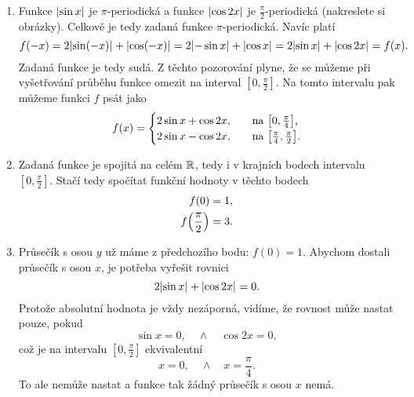 \documentclass[answers]{exam}
\begin{document}
\begin{questions}
\begin{solution}
\begin{enumerate}
    	\item Funkce $\abs{\sin x}$ je $\pi$-periodická a funkce $\abs{\cos 2x}$ je $\frac{\pi}{2}$-periodická (nakreslete si obrázky). Celkově je tedy zadaná funkce $\pi$-periodická. Navíc platí
    	\begin{equation*}
    		f(-x) = 2 \abs{\sin(-x)} + \abs{\cos(-x)} = 2 \abs{- \sin x} + \abs{\cos x} = 2 \abs{\sin x} + \abs{\cos 2x} = f(x).
    	\end{equation*}
    	Zadaná funkce je tedy sudá. Z těchto pozorování plyne, že se můžeme při vyšetřování průběhu funkce omezit na interval $[0, \frac{\pi}{2}]$. Na tomto intervalu pak můžeme funkci $f$ psát jako
    	\begin{equation}
    		\label{eq:1}
    		f(x)
    		=
    		\begin{cases}
    			2 \sin x + \cos 2x, &\quad \text{na $\brackets{0, \frac{\pi}{4}}$,}
    			\\
    			2 \sin x - \cos 2x, &\quad \text{na $\brackets{\frac{\pi}{4}, \frac{\pi}{2}}$.}
    		\end{cases}
    	\end{equation}
    	
    	\item \label{item:4b}
    		Zadaná funkce je spojitá na celém $\mathbb{R}$, tedy i v krajních bodech intervalu $[0, \frac{\pi}{2}]$. Stačí tedy spočítat funkční hodnoty v těchto bodech
    		\begin{align*}
    			f(0)
    			&=
    			1,
    			\\
    			f\parens{\frac{\pi}{2}}
    			&=
    			3.
    		\end{align*}
    	\item 
    		Průsečík s osou $y$ už máme z předchozího bodu: $f(0) = 1$. Abychom dostali průsečík s osou $x$, je potřeba vyřešit rovnici
    		\begin{equation*}
    			2 \abs{\sin x} + \abs{\cos 2x} = 0.
    		\end{equation*}
    		Protože absolutní hodnota je vždy nezáporná, vidíme, že rovnost může nastat pouze, pokud
    		\begin{equation*}
	    		\sin x = 0, \quad \land \quad \cos 2x = 0,
    		\end{equation*}
    		což je na intervalu $[0, \frac{\pi}{2}]$ ekvivalentní
    		\begin{equation*}
    			x = 0, \quad \land \quad x = \frac{\pi}{4}.
    		\end{equation*}
    		To ale nemůže nastat a funkce tak žádný průsečík s osou $x$ nemá.
    		

\end{enumerate}
\end{solution}
\end{questions}
\end{document}
